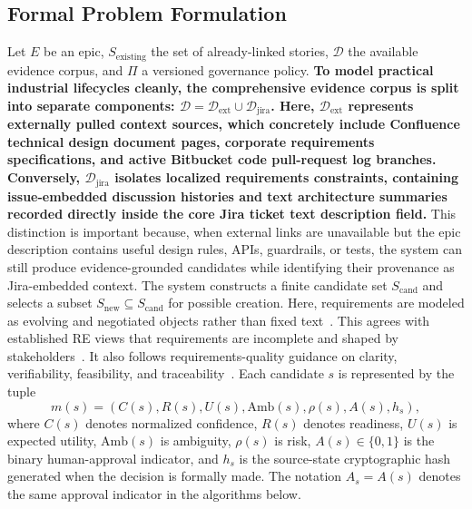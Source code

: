 \documentclass[pdflatex,sn-basic]{sn-jnl}
\begin{document}
\subsection{Formal Problem Formulation}
Let $E$ be an epic, $S_{\text{existing}}$ the set of already-linked stories, $\mathcal{D}$ the available evidence corpus, and $\Pi$ a versioned governance policy. \textbf{To model practical industrial lifecycles cleanly, the comprehensive evidence corpus is split into separate components: $\mathcal{D} = \mathcal{D}_{\text{ext}} \cup \mathcal{D}_{\text{jira}}$. Here, $\mathcal{D}_{\text{ext}}$ represents externally pulled context sources, which concretely include Confluence technical design document pages, corporate requirements specifications, and active Bitbucket code pull-request log branches. Conversely, $\mathcal{D}_{\text{jira}}$ isolates localized requirements constraints, containing issue-embedded discussion histories and text architecture summaries recorded directly inside the core Jira ticket text description field.} This distinction is important because, when external links are unavailable but the epic description contains useful design rules, APIs, guardrails, or tests, the system can still produce evidence-grounded candidates while identifying their provenance as Jira-embedded context. The system constructs a finite candidate set $S_{\text{cand}}$ and selects a subset $S_{\text{new}} \subseteq S_{\text{cand}}$ for possible creation. Here, requirements are modeled as evolving and negotiated objects rather than fixed text~\citep{R51}. This agrees with established RE views that requirements are incomplete and shaped by stakeholders~\citep{R61}. It also follows requirements-quality guidance on clarity, verifiability, feasibility, and traceability~\citep{R62}. Each candidate $s$ is represented by the tuple
\begin{equation}
m(s) = (C(s), R(s), U(s), \text{Amb}(s), \rho(s), A(s), h_s) ,
\end{equation}
where $C(s)$ denotes normalized confidence, $R(s)$ denotes readiness, $U(s)$ is expected utility, $\text{Amb}(s)$ is ambiguity, $\rho(s)$ is risk, $A(s) \in \{0, 1\}$ is the binary human-approval indicator, and $h_s$ is the source-state cryptographic hash generated when the decision is formally made. The notation $A_s=A(s)$ denotes the same approval indicator in the algorithms below.
\end{document}
